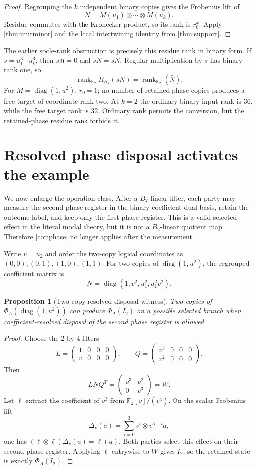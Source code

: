 \documentclass[11pt]{article}
\newtheorem{proposition}[theorem]{Proposition}
\theoremstyle{definition}
\theoremstyle{remark}
\newcommand{\F}{\mathbb F_2}
\newcommand{\rank}{\operatorname{rank}}
\newcommand{\diag}{\operatorname{diag}}
\begin{document}
\begin{proof}
Regrouping the $k$ independent binary copies gives the Frobenius lift of
\[
  N=M(u_1)\otimes\cdots\otimes M(u_k).
\]
Residue commutes with the Kronecker product, so its rank is $r_0^k$. Apply \cref{thm:unitminor} and the local intertwining identity from \cref{thm:support}.
\end{proof}

The earlier socle-rank obstruction is precisely this residue rank in binary form. If
$s=u_1^3\cdots u_k^3$, then $s\mathfrak m=0$ and $sN=s\bar N$. Regular multiplication by $s$ has binary rank one, so
\[
  \rank_{\F}R_{B_k}(sN)=\rank_{\F}(\bar N).
\]
For $M=\diag(1,u^2)$, $r_0=1$; no number of retained-phase copies produces a free target of coordinate rank two. At $k=2$ the ordinary binary input rank is $36$, while the free target rank is $32$. Ordinary rank permits the conversion, but the retained-phase residue rank forbids it.

\section{Resolved phase disposal activates the example}

We now enlarge the operation class. After a $B_2$-linear filter, each party may measure the second phase register in the binary coefficient dual basis, retain the outcome label, and keep only the first phase register. This is a valid selected effect in the literal modal theory, but it is not a $B_2$-linear quotient map. Therefore \cref{cor:phase} no longer applies after the measurement.

Write $v=u_2$ and order the two-copy logical coordinates as $(0,0),(0,1),(1,0),(1,1)$. For two copies of $\diag(1,u^2)$, the regrouped coefficient matrix is
\[
  N=\diag(1,v^2,u_1^2,u_1^2v^2).
\]

\begin{proposition}[Two-copy resolved-disposal witness]\label{prop:activation}
Two copies of $\Phi_A(\diag(1,u^2))$ can produce $\Phi_A(I_2)$ on a possible selected branch when coefficient-resolved disposal of the second phase register is allowed.
\end{proposition}

\begin{proof}
Choose the $2$-by-$4$ filters
\[
  L=\begin{pmatrix}1&0&0&0\\v&0&0&0\end{pmatrix},\qquad
  Q=\begin{pmatrix}v^3&0&0&0\\v^2&0&0&0\end{pmatrix}.
\]
Then
\[
  LNQ^T=
  \begin{pmatrix}v^3&v^2\\0&v^3\end{pmatrix}=W.
\]
Let $\ell$ extract the coefficient of $v^3$ from $\F[v]/(v^4)$. On the scalar Frobenius lift
\[
  \Delta_v(a)=\sum_{i=0}^{3}v^i\otimes v^{3-i}a,
\]
one has $(\ell\otimes\ell)\Delta_v(a)=\ell(a)$. Both parties select this effect on their second phase register. Applying $\ell$ entrywise to $W$ gives $I_2$, so the retained state is exactly $\Phi_A(I_2)$.
\end{proof}
\end{document}
